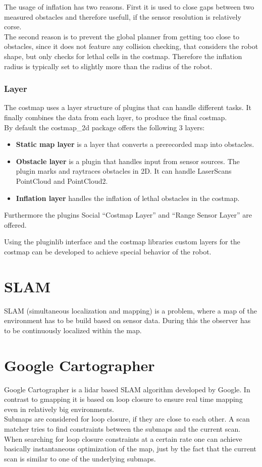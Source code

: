 The usage of inflation has two reasons. First it is used to close gaps between two measured obstacles and therefore usefull, if the sensor resolution is relatively corse.\\
The second reason is to prevent the global planner from getting too close to obstacles, since it does not feature any collision checking, that considers the robot shape, but only checks for lethal cells in the costmap. Therefore the inflation radius is typically set to slightly more than the radius of the robot\cite{costmap}.

\subsubsection{Layer}
The costmap uses a layer structure of plugins that can handle different tasks. It finally combines the data from each layer, to produce the final costmap.\\

By default the costmap\_2d package offers the following 3 layers:
\begin{itemize}
	\item \textbf{Static map layer} is a layer that converts a prerecorded map into obstacles.
	\item  \textbf{Obstacle layer} is a plugin that handles input from sensor sources. The plugin marks and raytraces obstacles in 2D. It can handle LaserScans PointCloud and PointCloud2.
	\item \textbf{Inflation layer} handles the inflation of lethal obstacles in the costmap.
\end{itemize}

Furthermore the plugins Social ``Costmap Layer'' and ``Range Sensor Layer'' are offered.

Using the pluginlib interface and the costmap libraries custom layers for the costmap can be developed to achieve special behavior of the robot.

\section{SLAM}

SLAM (simultaneous localization and mapping) is a problem, where a map of the environment has to be build based on sensor data. During this the observer has to be continuously localized within the map.

\section{Google Cartographer}
Google Cartographer is a lidar based SLAM algorithm developed by Google. In contrast to gmapping it is based on loop closure to ensure real time mapping even in relatively big environments.\\
Submaps are considered for loop closure, if they are close to each other. A scan matcher tries to find constraints between the submaps and the current scan. When searching for loop closure constraints at a certain rate one can achieve basically instantaneous optimization of the map, just by the fact that the current scan is similar to one of the underlying submaps\cite{cartographer}.\\

